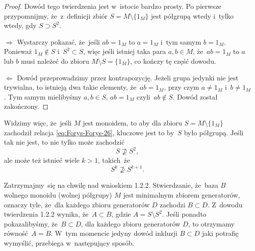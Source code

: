 \documentclass[a4paper,11pt]{article}
\begin{document}
\begin{proof}

  Dowód tego twierdzenia jest w~istocie bardzo prosty. Po pierwsze
  przypomnijmy, że~z~definicji zbiór $S = M \setminus \{ 1_{ M } \}$
  jest półgrupą wtedy i~tylko wtedy, gdy $S \supset S^{ 2 }$.

  $\Rightarrow$ Wystarczy pokazać, że~jeśli $a b = 1_{ M }$ to
  $a = 1_{ M }$ i~tym samym $b = 1_{ M }$. Ponieważ $1_{ M } \notin S$
  i~$S^{ 2 } \subset S$, więc jeśli istniej taka para $a, b \in M$,
  że~$ab = 1_{ M }$ to $a$ lub $b$ musi należeć do zbioru
  $M \setminus S = \{ 1_{ M } \}$, co kończy tę część dowodu.

  $\Leftarrow$ Dowód przeprowadzimy przez kontrapozycję. Jeżeli grupa jedynki
  nie jest trywialna, to istnieją dwa takie elementy,
  że~$a b = 1_{ M }$, przy czym $a \neq 1_{ M }$ i~$b \neq 1_{ M }$.
  Tym samym mielibyśmy $a, b \in S$, $ab = 1_{ M }$
  czyli~$ab \notin S$. Dowód został zakończony.

\end{proof}





Widzimy więc, że~jeśli $M$ jest monoidem, to aby dla zbioru
$S = M \setminus \{ 1_{ M } \}$ zachodził relacja
\eqref{eq:Forys-Forys-26}, kluczowe jest to by~$S$ było półgrupą.
Jeśli tak nie jest, to nie tylko może zachodzić
\begin{equation}
  \label{eq:Forys-Forys-32}
  S \nsupseteq S^{ 2 },
\end{equation}
ale może też istnieć wiele $k > 1$, takich~że
\begin{equation}
  \label{eq:Forys-Forys-33}
  S^{ k } \nsupseteq S^{ k + 1 }.
\end{equation}

\vspace{\spaceFour}





\start {} Zatrzymajmy~się na chwilę nad wnioskiem 1.2.2.
Stwierdzanie, że~baza $B$ wolnego monoidu (wolnej półgrupy) $M$ jest
minimalnym zbiorem generatorów, oznaczy tyle, że~dla każdego zbioru
generatorów $D$ zachodzi $B \subset D$. Z~dowodu twierdzenia 1.2.2
wynika, że~$A \subset B$, gdzie $A = S \setminus S^{ 2 }$. Jeśli ponadto pokazalibyśmy,
że~$B \subset D$, dla każdego zbioru generatorów $D$, to otrzymamy
równość~$A = B$. W~tym momencie jedyny dowód inkluzji $B \subset D$ jaki
potrafię wymyślić, przebiega w~następujący sposób.
\end{document}
